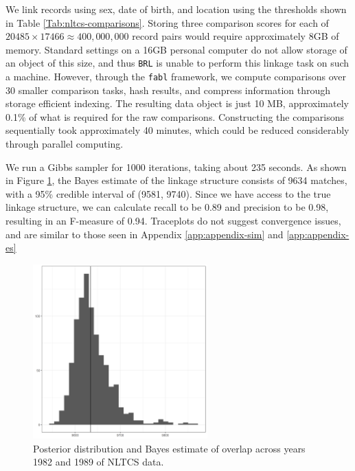 \documentclass[ba]{imsart}
\begin{document}
	We link records using sex, date of birth, and location using the thresholds shown in Table \ref{Tab:nltcs-comparisons}. Storing three comparison scores for each of $20485 \times 17466 \approx 400,000,000$ record pairs would require approximately 8GB of memory. Standard settings on a 16GB personal computer do not allow storage of an object of this size, and thus \texttt{BRL} is unable to perform this linkage task on such a machine. However, through the \texttt{fabl} framework, we compute comparisons over 30 smaller comparison tasks, hash results, and compress information through storage efficient indexing. The resulting data object is just 10 MB, approximately 0.1\% of what is required for the raw comparisons. Constructing the comparisons sequentially took approximately 40 minutes, which could be reduced considerably through parallel computing. 
	
	We run a Gibbs sampler for 1000 iterations, taking about 235 seconds. As shown in Figure \ref{fig:nltcs-overlap-plot}, the Bayes estimate of the linkage structure consists of 9634 matches, with a 95\% credible interval of (9581, 9740). Since we have access to the true linkage structure, we can calculate recall to be 0.89 and precision to be 0.98, resulting in an F-measure of 0.94. Traceplots do not suggest convergence issues, and are similar to those seen in Appendix \ref{app:appendix-sim} and \ref{app:appendix-es}
	

	
	\begin{figure}[h]
		\begin{center}
			\includegraphics[width=0.6\textwidth]{../notes/figures/nltcs/overlap_posterior4}
			\caption{Posterior distribution and Bayes estimate of overlap across years 1982 and 1989 of NLTCS data.}
			\label{fig:nltcs-overlap-plot}
		\end{center}
	\end{figure}
	
\end{document}
